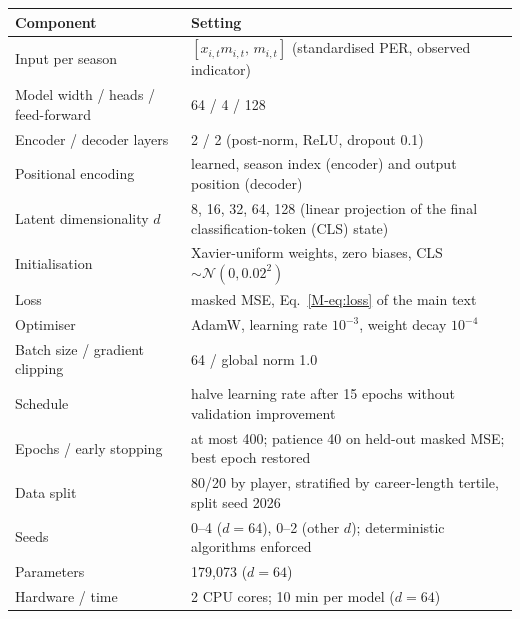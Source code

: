 \begin{tabular}{ll}\toprule
Component & Setting \\ \midrule
Input per season & $[x_{i,t}m_{i,t},\,m_{i,t}]$ (standardised PER, observed indicator) \\
Model width / heads / feed-forward & 64 / 4 / 128 \\
Encoder / decoder layers & 2 / 2 (post-norm, ReLU, dropout 0.1) \\
Positional encoding & learned, season index (encoder) and output position (decoder) \\
Latent dimensionality $d$ & 8, 16, 32, 64, 128 (linear projection of the final classification-token (CLS) state) \\
Initialisation & Xavier-uniform weights, zero biases, CLS $\sim\mathcal N(0,0.02^2)$ \\
Loss & masked MSE, Eq.~\eqref{M-eq:loss} of the main text \\
Optimiser & AdamW, learning rate $10^{-3}$, weight decay $10^{-4}$ \\
Batch size / gradient clipping & 64 / global norm 1.0 \\
Schedule & halve learning rate after 15 epochs without validation improvement \\
Epochs / early stopping & at most 400; patience 40 on held-out masked MSE; best epoch restored \\
Data split & 80/20 by player, stratified by career-length tertile, split seed 2026 \\
Seeds & 0--4 ($d=64$), 0--2 (other $d$); deterministic algorithms enforced \\
Parameters & 179,073 ($d=64$) \\
Hardware / time & 2 CPU cores; 10 min per model ($d=64$) \\
\bottomrule\end{tabular}